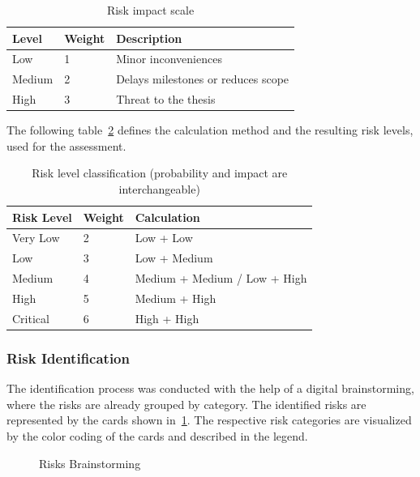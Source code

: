 \begin{table}[h]
    \begin{tabular}{lll}
        \toprule
        \textbf{Level} & \textbf{Weight} & \textbf{Description} \\
        \midrule
        Low & 1 & Minor inconveniences \\
        Medium & 2 & Delays milestones or reduces scope \\
        High & 3 & Threat to the thesis \\
        \bottomrule
    \end{tabular}
    \caption{Risk impact scale}\label{tab:risk-impact-scale}
\end{table}

The following table~\ref{tab:risk-level} defines the calculation method and the resulting risk levels, used for the assessment.

\begin{table}[h]
    \begin{tabular}{lll}
        \toprule
        \textbf{Risk Level} & \textbf{Weight} & \textbf{Calculation} \\
        \midrule
        Very Low & 2 & Low + Low \\
        Low & 3 & Low + Medium \\
        Medium & 4 & Medium + Medium / Low + High \\
        High & 5 & Medium + High \\
        Critical & 6 & High + High \\
        \bottomrule
    \end{tabular}
    \caption{Risk level classification (probability and impact are interchangeable)}\label{tab:risk-level}
\end{table}

\subsubsection{Risk Identification}\label{subsubsec:risk_identification}

The identification process was conducted with the help of a digital brainstorming, where the risks are already grouped by category.
The identified risks are represented by the cards shown in~\ref{fig:risks-brainstorming}.
The respective risk categories are visualized by the color coding of the cards and described in the legend.

\begin{figure}[H]
    \centering
    
    \caption{Risks Brainstorming}
    \label{fig:risks-brainstorming}
\end{figure}

